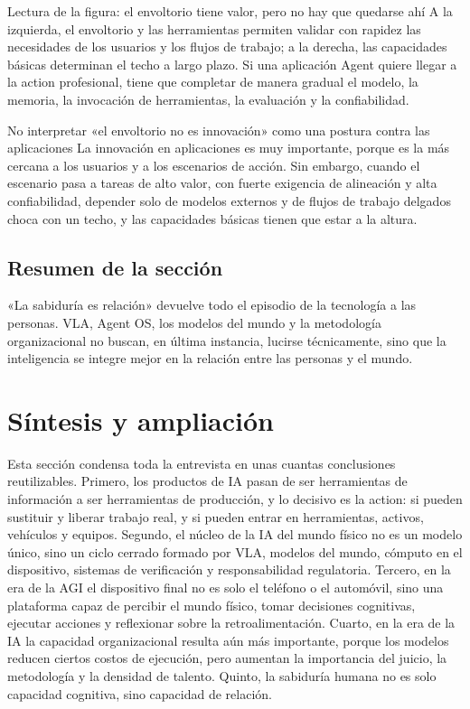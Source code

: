 \documentclass[a4paper]{article}
\begin{document}
\begin{knowledgebox}{Lectura de la figura: el envoltorio tiene valor, pero no hay que quedarse ahí}
A la izquierda, el envoltorio y las herramientas permiten validar con rapidez las necesidades de los usuarios y los flujos de trabajo; a la derecha, las capacidades básicas determinan el techo a largo plazo. Si una aplicación Agent quiere llegar a la action profesional, tiene que completar de manera gradual el modelo, la memoria, la invocación de herramientas, la evaluación y la confiabilidad.
\end{knowledgebox}

\begin{warningbox}{No interpretar «el envoltorio no es innovación» como una postura contra las aplicaciones}
La innovación en aplicaciones es muy importante, porque es la más cercana a los usuarios y a los escenarios de acción. Sin embargo, cuando el escenario pasa a tareas de alto valor, con fuerte exigencia de alineación y alta confiabilidad, depender solo de modelos externos y de flujos de trabajo delgados choca con un techo, y las capacidades básicas tienen que estar a la altura.
\end{warningbox}

\subsection{Resumen de la sección}

«La sabiduría es relación» devuelve todo el episodio de la tecnología a las personas. VLA, Agent OS, los modelos del mundo y la metodología organizacional no buscan, en última instancia, lucirse técnicamente, sino que la inteligencia se integre mejor en la relación entre las personas y el mundo.
\section{Síntesis y ampliación}

Esta sección condensa toda la entrevista en unas cuantas conclusiones reutilizables. Primero, los productos de IA pasan de ser herramientas de información a ser herramientas de producción, y lo decisivo es la action: si pueden sustituir y liberar trabajo real, y si pueden entrar en herramientas, activos, vehículos y equipos. Segundo, el núcleo de la IA del mundo físico no es un modelo único, sino un ciclo cerrado formado por VLA, modelos del mundo, cómputo en el dispositivo, sistemas de verificación y responsabilidad regulatoria. Tercero, en la era de la AGI el dispositivo final no es solo el teléfono o el automóvil, sino una plataforma capaz de percibir el mundo físico, tomar decisiones cognitivas, ejecutar acciones y reflexionar sobre la retroalimentación. Cuarto, en la era de la IA la capacidad organizacional resulta aún más importante, porque los modelos reducen ciertos costos de ejecución, pero aumentan la importancia del juicio, la metodología y la densidad de talento. Quinto, la sabiduría humana no es solo capacidad cognitiva, sino capacidad de relación.
\end{document}
